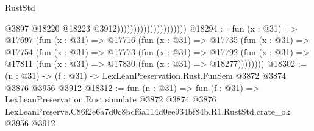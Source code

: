 \begin{lexlean}{RustStd}
\begin{coremodule}
                                              @3897
                                              @18220
                                              @18223
                                              @3912)))))))))))))))))))))
@18294 := fun (x : @31) =>
  @17697
    (fun (x : @31) =>
    @17716
      (fun (x : @31) =>
      @17735
        (fun (x : @31) =>
        @17754
          (fun (x : @31) =>
          @17773
            (fun (x : @31) =>
            @17792
              (fun (x : @31) => @17811 (fun (x : @31) => @17830 (fun (x : @31) => @18277))))))))
@18302 := (n : @31) -> (f : @31) -> LexLeanPreservation.Rust.FunSem @3872 @3874 @3876 @3956 @3912
@18312 := fun (n : @31) =>
  fun (f : @31) =>
  LexLeanPreservation.Rust.simulate
    @3872
    @3874
    @3876
    LexLeanPreserve.C86f2e6a7d0c8bcf6a114d0ee934bf84b.R1.RustStd.crate_ok
    @3956
    @3912
\end{coremodule}
\end{lexlean}
